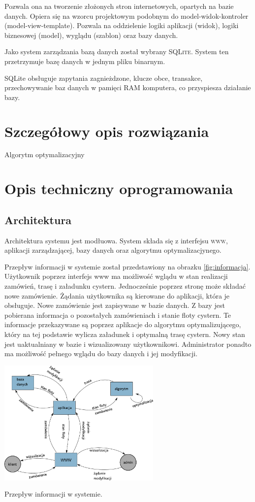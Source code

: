 \documentclass[11pt,a4paper,oneside]{mwart}
\begin{document}
Pozwala ona na tworzenie złożonych stron internetowych, opartych na bazie danych. Opiera się na wzorcu projektowym podobnym do model-widok-kontroler (model-view-template). Pozwala na oddzielenie logiki aplikacji (widok), logiki biznesowej (model), wyglądu (szablon) oraz bazy danych.

Jako system zarządzania bazą danych został wybrany \textsc{SQLite}. System ten przetrzymuje bazę danych w jednym pliku binarnym. 

SQLite obsługuje zapytania zagnieżdzone, klucze obce, transakce, przechowywanie baz danych w pamięci RAM komputera, co przyspiesza działanie bazy.

\section{Szczegółowy opis rozwiązania}
Algorytm optymalizacyjny

\section{Opis techniczny oprogramowania}
\subsection{Architektura}
Architektura systemu jest modłuowa. System składa się z interfejsu \textsc{www}, aplikacji zarządzającej, bazy danych oraz algorytmu optymalizacjynego.

Przepływ informacji w systemie został przedstawiony na obrazku \ref{fig:informacja}. Użytkownik poprzez interfejs www ma możliwość wglądu w stan realizacji zamówień, trasę i załadunku cystern. Jednocześnie poprzez stronę może składać nowe zamówienie. Żądania użytkownika są kierowane do aplikacji, która je obsługuje. Nowe zamówienie jest zapisywane w bazie danych. Z bazy jest pobierana informacja o pozostałych zamówieniach i stanie floty cystern. Te informacje przekazywane są poprzez aplikacje do algorytmu optymalizującego, który na tej podstawie wylicza załadunek i optymalną trasę cystern.  Nowy stan jest uaktualniany w bazie i wizualizowany użytkownikowi.
Administrator ponadto ma możliwość pełnego wglądu do bazy danych i jej modyfikacji.

\begin{schemat}
  \centering
  \includegraphics[width=0.6\textwidth]{pics/przep_inf.pdf}
  \caption{Przepływ informacji w systemie.}
  \label{fig:informacja}
\end{schemat}
\end{document}

